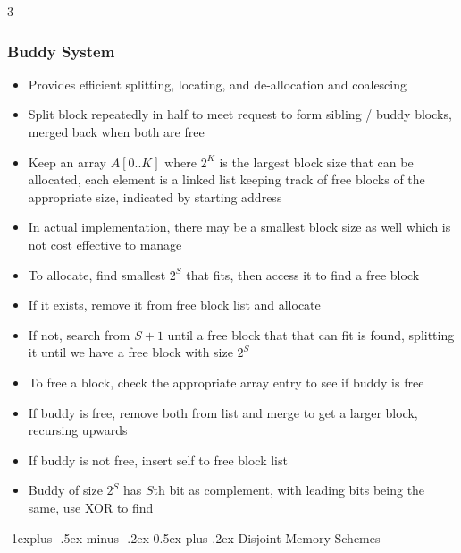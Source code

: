 \documentclass[10pt, landscape]{article}
\makeatletter
\renewcommand{\section}{\@startsection{section}{1}{0mm}%
                                {-1ex plus -.5ex minus -.2ex}%
                                {0.5ex plus .2ex}%
                                {\normalfont\large\bfseries}}
\renewcommand{\section}{\@startsection{section}{2}{0mm}%
                                {-1explus -.5ex minus -.2ex}%
                                {0.5ex plus .2ex}%
                                {\normalfont\normalsize\bfseries}}
\makeatother
\begin{document}
\begin{multicols*}{3}
\subsubsection{Buddy System}
\begin{itemize}
    \item Provides efficient splitting, locating, and de-allocation and coalescing
    \item Split block repeatedly in half to meet request to form sibling / buddy blocks, merged back when both are free
    \item Keep an array $A[0..K]$ where $2^K$ is the largest block size that can be allocated, each element is a linked list keeping track of free blocks of the appropriate size, indicated by starting address
    \item In actual implementation, there may be a smallest block size as well which is not cost effective to manage
    \item To allocate, find smallest $2^S$ that fits, then access it to find a free block
    \item If it exists, remove it from free block list and allocate
    \item If not, search from $S+1$ until a free block that that can fit is found, splitting it until we have a free block with size $2^S$
    \item To free a block, check the appropriate array entry to see if buddy is free
    \item If buddy is free, remove both from list and merge to get a larger block, recursing upwards
    \item If buddy is not free, insert self to free block list
    \item Buddy of size $2^S$ has $S$th bit as complement, with leading bits being the same, use XOR to find
\end{itemize}

\section{Disjoint Memory Schemes}

\end{multicols*}
\end{document}
